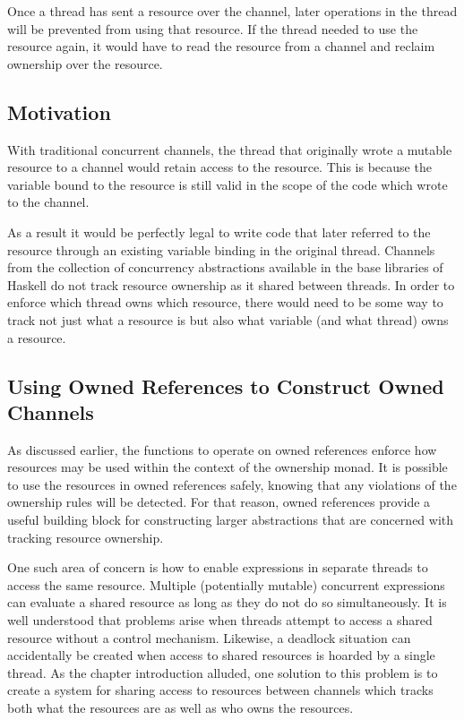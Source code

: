\documentclass[onehalf,11pt]{beavtex}
\begin{document}
Once a thread has sent a resource over the channel,
later operations in the thread will be prevented from using that resource.
If the thread needed to use the resource again, it would have to read the
resource from a channel and reclaim ownership over the resource.

\subsection{Motivation}

With traditional concurrent channels, the thread that originally wrote
a mutable resource to a channel would retain access to the resource. This is
because the variable bound to the resource is still valid in the scope of the
code which wrote to the channel.

As a result it would be perfectly legal to write code that later referred to the
resource through an existing variable binding in the original thread.
Channels from the collection of concurrency abstractions available in the
base libraries of Haskell do not track resource ownership as it shared
between threads.
In order to enforce which thread owns which resource, there would need to be
some way to track not just what a resource is but also what variable (and what
thread) owns a resource.

\subsection{Using Owned References to Construct Owned Channels}

As discussed earlier, the functions to operate on owned references enforce
how resources may be used within the context of the ownership monad.
It is possible to use the resources in owned references safely, knowing that any
violations of the ownership rules will be detected.
For that reason, owned references provide a useful building block for constructing
larger abstractions that are concerned with tracking resource ownership.

One such area of concern is how to enable expressions in separate
threads to access the same resource.
Multiple (potentially mutable) concurrent expressions can evaluate a shared
resource as long as they do not do so simultaneously.
It is well understood that problems arise when threads attempt to access a
shared resource without a control mechanism.
Likewise, a deadlock situation can accidentally be created
when access to shared resources is hoarded by a single thread.
As the chapter introduction alluded, one solution to this problem is to
create a system for sharing access to resources between channels which tracks
both what the resources are as well as who owns the resources.
\end{document}
